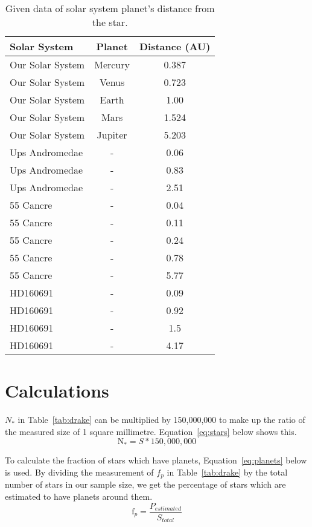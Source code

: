 \documentclass{article}
\begin{document}
\clearpage
\begin{table}[h!]
\begin{center}
\begin{tabular}{l c c}
\hline
Solar System & Planet & Distance (AU)\\
\hline
\hline
Our Solar System & Mercury & 0.387\\
Our Solar System & Venus & 0.723\\
Our Solar System & Earth & 1.00\\
Our Solar System & Mars & 1.524\\
Our Solar System & Jupiter & 5.203\\
Ups Andromedae & - & 0.06\\
Ups Andromedae & - & 0.83\\
Ups Andromedae & - & 2.51\\
55 Cancre & - &  0.04\\
55 Cancre & - &  0.11\\
55 Cancre & - &  0.24\\
55 Cancre & - &  0.78\\
55 Cancre & - &  5.77\\
HD160691 & - &  0.09\\
HD160691 & - &  0.92\\
HD160691 & - &  1.5\\
HD160691 & - &  4.17\\
\hline
\end{tabular}
\end{center}
\caption{Given data of solar system planet's distance from the star.\label{tab:planets}}
\end{table}


\section{Calculations}
\label{sec:calc}

${N}_{*}$ in Table~\ref{tab:drake} can be
multiplied by 150,000,000 to make up the ratio of the measured size of 1 square millimetre. Equation~\ref{eq:stars} below 
shows this.
\begin{equation}
\label{eq:stars}
\text{N}_{*} = S * 150,000,000
\end{equation}

To calculate the fraction of stars which have planets, Equation~\ref{eq:planets} below is used. By dividing the measurement of
${f}_{p}$ in Table~\ref{tab:drake} by the total number of stars in our sample size, we get the percentage of stars which are 
estimated to have planets around them.
\begin{equation}
\label{eq:planets}
\text{f}_{p} = \frac{{P}_{estimated}}{{S}_{total}}
\end{equation}
\end{document}
